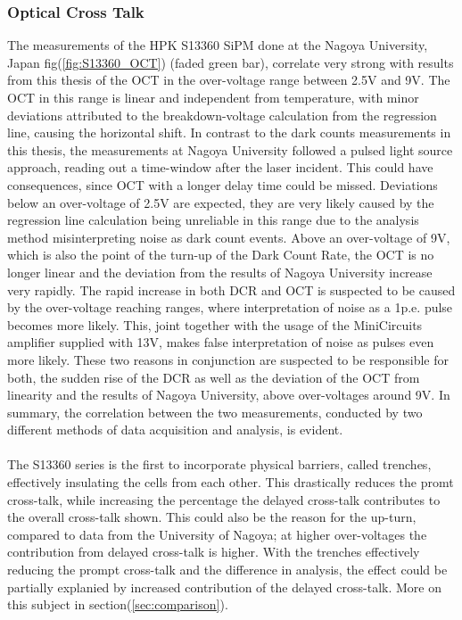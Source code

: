 \documentclass[12pt,article,type=msc,colorback,accentcolor=tud9c]{tudthesis}
\begin{document}
\subsubsection{Optical Cross Talk}

The measurements of the HPK S13360 SiPM done at the Nagoya University\cite{Hiro}, Japan fig(\ref{fig:S13360_OCT}) (faded green bar), correlate very strong with results from this thesis of the OCT in the over-voltage range between 2.5V and 9V. The OCT in this range is linear and independent from temperature, with minor deviations attributed to the breakdown-voltage calculation from the regression line, causing the horizontal shift. In contrast to the dark counts measurements in this thesis, the measurements at Nagoya University followed a pulsed light source approach, reading out a time-window after the laser incident. This could have consequences, since OCT with a longer delay time could be missed. Deviations below an over-voltage of 2.5V are expected, they are very likely caused by the regression line calculation being unreliable in this range due to the analysis method misinterpreting noise as dark count events. Above an over-voltage of 9V, which is also the point of the turn-up of the Dark Count Rate, the OCT is no longer linear and the deviation from the results of Nagoya University increase very rapidly. The rapid increase in both DCR and OCT is suspected to be caused by the over-voltage reaching ranges, where interpretation of noise as a 1p.e. pulse becomes more likely. This, joint together with the usage of the MiniCircuits amplifier supplied with 13V, makes false interpretation of noise as pulses even more likely. These two reasons in conjunction are suspected to be responsible for both, the sudden rise of the DCR as well as the deviation of the OCT from linearity and the results of Nagoya University, above over-voltages around 9V. In summary, the correlation between the two measurements, conducted by two different methods of data acquisition and analysis, is evident.\\\\

The S13360 series is the first to incorporate physical barriers, called trenches, effectively insulating the cells from each other. This drastically reduces the promt cross-talk, while increasing the percentage the delayed cross-talk contributes to the overall cross-talk shown. This could also be the reason for the up-turn, compared to data from the University of Nagoya; at higher over-voltages the contribution from delayed cross-talk is higher\cite{DelayedOCT}. With the trenches effectively reducing the prompt cross-talk and the difference in analysis, the effect could be partially explanied by increased contribution of the delayed cross-talk. More on this subject in section(\ref{sec:comparison}).
\end{document}
